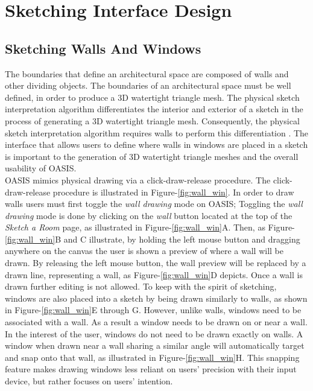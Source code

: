\section{Sketching Interface Design}

\subsection{Sketching Walls And Windows}
The boundaries that define an architectural space are composed of walls and other dividing objects.  The  boundaries of an architectural space must be well defined, in order to produce a 3D watertight triangle mesh.  The physical sketch interpretation algorithm differentiates the interior and exterior of a sketch in the process of generating a 3D watertight triangle mesh.  Consequently, the physical sketch interpretation algorithm requires walls to perform this differentiation \cite{cutler2009inferring}.  The interface that allows users to define where walls in windows are placed in a sketch is important to the generation of 3D watertight triangle meshes and the overall usability of OASIS.\\ 

OASIS mimics physical drawing via a click-draw-release procedure.  The click-draw-release procedure is illustrated in Figure-\ref{fig:wall_win}.  In order to draw walls users must first toggle the \textit{wall drawing} mode on OASIS; Toggling the \textit{wall drawing} mode is done by clicking on the \textit{wall} button located at the top of the \textit{Sketch a Room} page, as illustrated in Figure-\ref{fig:wall_win}A.  Then, as Figure-\ref{fig:wall_win}B and C illustrate, by holding the left mouse button and dragging anywhere on the canvas the user is shown a preview of where a wall will be drawn.  By releasing the left mouse button, the wall preview will be replaced by a drawn line, representing a wall, as Figure-\ref{fig:wall_win}D depicts.  Once a wall is drawn further editing is not allowed.  To keep with the spirit of sketching, windows are also placed into a sketch by being drawn similarly to walls, as shown in Figure-\ref{fig:wall_win}E through G.  However, unlike walls, windows need to be associated with a wall.  As a result a window needs to be drawn on or near a wall.  In the interest of the user, windows do not need to be drawn exactly on walls.  A window when drawn near a wall sharing a similar angle will automatically target and snap onto that wall, as illustrated in Figure-\ref{fig:wall_win}H.  This snapping feature makes drawing windows less reliant on users' precision with their input device, but rather focuses on users' intention. \\

